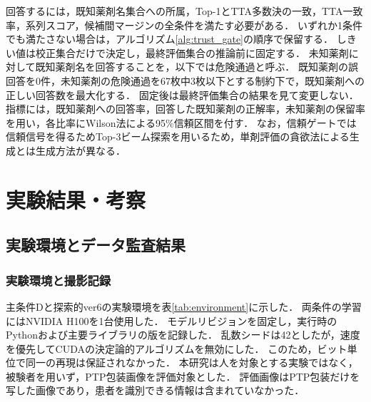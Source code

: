 \documentclass[uplatex,dvipdfmx]{jsarticle}
\begin{document}
\enlargethispage{2\baselineskip}
回答するには，既知薬剤名集合への所属，Top-1とTTA多数決の一致，TTA一致率，系列スコア，候補間マージンの全条件を満たす必要がある．
いずれか1条件でも満たさない場合は，アルゴリズム\ref{alg:trust_gate}の順序で保留する．
しきい値は校正集合だけで決定し，最終評価集合の推論前に固定する．
未知薬剤に対して既知薬剤名を回答することを，以下では危険通過と呼ぶ．
既知薬剤の誤回答を0件，未知薬剤の危険通過を67枚中3枚以下とする制約下で，既知薬剤への正しい回答数を最大化する．
固定後は最終評価集合の結果を見て変更しない．
指標には，既知薬剤への回答率，回答した既知薬剤の正解率，未知薬剤の保留率を用い，各比率にWilson法による95\%信頼区間を付す．
なお，信頼ゲートでは信頼信号を得るためTop-3ビーム探索を用いるため，単剤評価の貪欲法による生成とは生成方法が異なる．

\clearpage
\section{実験結果・考察}\label{sec:results}

\subsection{実験環境とデータ監査結果}

\subsubsection{実験環境と撮影記録}

主条件Dと探索的ver6の実験環境を表\ref{tab:environment}に示した．
両条件の学習にはNVIDIA H100を1台使用した．
モデルリビジョンを固定し，実行時のPythonおよび主要ライブラリの版を記録した．
乱数シードは42としたが，速度を優先してCUDAの決定論的アルゴリズムを無効にした．
このため，ビット単位で同一の再現は保証されなかった．
本研究は人を対象とする実験ではなく，被験者を用いず，PTP包装画像を評価対象とした．
評価画像はPTP包装だけを写した画像であり，患者を識別できる情報は含まれていなかった．
\end{document}
